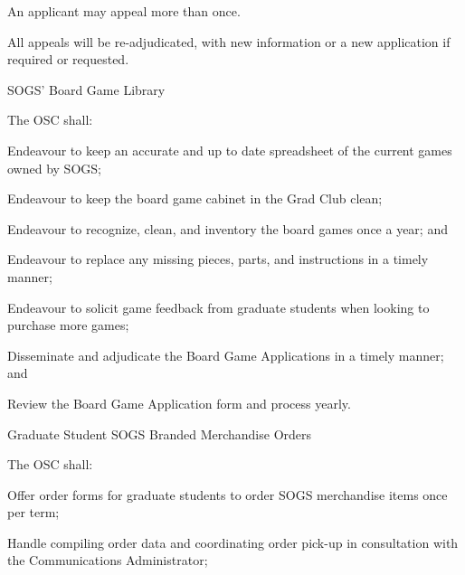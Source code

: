 \begin{longenum}[ label*=\thesubsection.\arabic*., align=left]
\begin{longenum}[label*=\arabic*., align=left]
\begin{longenum}[label*=\arabic*., align=left]
\begin{longenum}[label*=\arabic*., align=left]
\begin{longenum}[label*=\arabic*., align=left]
						\begin{longenum}[label*=\arabic*., align=left]
						\item An applicant may appeal more than once.
						\end{longenum}
					\item All appeals will be re-adjudicated, with new information or a new application if required or requested.
					\end{longenum}
				\end{longenum}
			\end{longenum}
		\end{longenum}
	\item SOGS' Board Game Library
		\begin{longenum}[label*=\arabic*., align=left]
		\item The OSC shall:
			\begin{longenum}[label*=\arabic*., align=left]
			\item Endeavour to keep an accurate and up to date spreadsheet of the current games owned by SOGS;
			\item Endeavour to keep the board game cabinet in the Grad Club clean;
			\item Endeavour to recognize, clean, and inventory the board games once a year; and
				\begin{longenum}[label*=\arabic*., align=left]
				\item Endeavour to replace any missing pieces, parts, and instructions in a timely manner;
				\end{longenum}
			\item Endeavour to solicit game feedback from graduate students when looking to purchase more games;
			\item Disseminate and adjudicate the Board Game Applications in a timely manner; and
			\item Review the Board Game Application form and process yearly.
			\end{longenum}
		\end{longenum}
	\item Graduate Student SOGS Branded Merchandise Orders
		\begin{longenum}[label*=\arabic*., align=left]
		\item The OSC shall:
			\begin{longenum}[label*=\arabic*., align=left]
			\item Offer order forms for graduate students to order SOGS merchandise items once per term;
			\item Handle compiling order data and coordinating order pick-up in consultation with the Communications Administrator;

\end{longenum}
\end{longenum}
\end{longenum}
